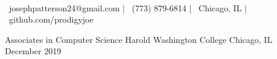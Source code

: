 \documentclass[]{awesome-cv}
\begin{document}
\begin{center}
	  \\
	\vspace{2mm}
	{\faEnvelope\ josephpatterson24@gmail.com} | {\faMobile\ (773) 879-6814} | {\faMapMarker\ Chicago, IL} | {\faLink\ github.com/prodigyjoe}
\end{center}
\begin{cventries}
	\cventry
	{Associates in Computer Science}
	{Harold Washington College}
	{Chicago, IL}
	{December 2019}
	{}
\end{cventries}
\end{document}

